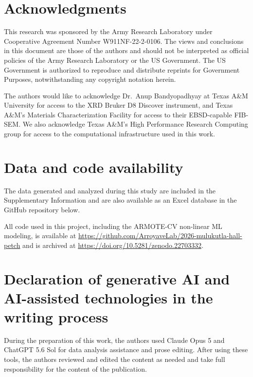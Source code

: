\documentclass[5p,times,twocolumn]{elsarticle}
\begin{document}
\section*{Acknowledgments}
This research was sponsored by the Army Research Laboratory under Cooperative Agreement Number W911NF-22-2-0106. The views and conclusions in this document are those of the authors and should not be interpreted as official policies of the Army Research Laboratory or the US Government. The US Government is authorized to reproduce and distribute reprints for Government Purposes, notwithstanding any copyright notation herein.

The authors would like to acknowledge Dr.\ Anup Bandyopadhyay at Texas A\&M University for access to the XRD Bruker D8 Discover instrument, and Texas A\&M's Materials Characterization Facility for access to their EBSD-capable FIB-SEM. We also acknowledge Texas A\&M's High Performance Research Computing group for access to the computational infrastructure used in this work.

\section*{Data and code availability}

The data generated and analyzed during this study are included in the Supplementary Information and are also available as an Excel database in the GitHub repository below.

All code used in this project, including the ARMOTE-CV non-linear ML modeling, is available at \url{https://github.com/ArroyaveLab/2026-mulukutla-hall-petch} and is archived at \url{https://doi.org/10.5281/zenodo.22703332}.

\section*{Declaration of generative AI and AI-assisted technologies in the writing process}

During the preparation of this work, the authors used Claude Opus 5 and ChatGPT 5.6 Sol for data analysis assistance and prose editing. After using these tools, the authors reviewed and edited the content as needed and take full responsibility for the content of the publication.



\end{document}
